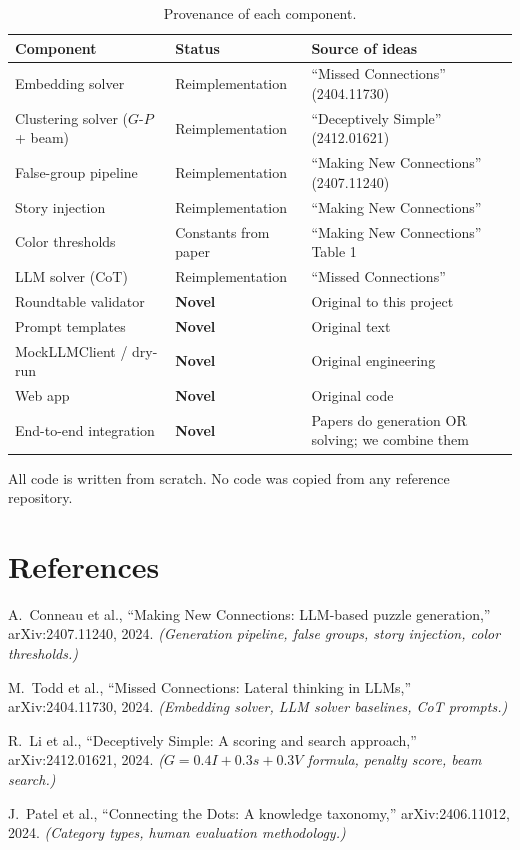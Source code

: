 \documentclass[11pt, letterpaper]{article}
\begin{document}
\begin{table}[H]
\centering
\small
\caption{Provenance of each component.}
\begin{tabular}{@{}lll@{}}
\toprule
Component & Status & Source of ideas \\
\midrule
Embedding solver & Reimplementation & ``Missed Connections'' (2404.11730) \\
Clustering solver ($G$-$P$ + beam) & Reimplementation & ``Deceptively Simple'' (2412.01621) \\
False-group pipeline & Reimplementation & ``Making New Connections'' (2407.11240) \\
Story injection & Reimplementation & ``Making New Connections'' \\
Color thresholds & Constants from paper & ``Making New Connections'' Table 1 \\
LLM solver (CoT) & Reimplementation & ``Missed Connections'' \\
\midrule
Roundtable validator & \textbf{Novel} & Original to this project \\
Prompt templates & \textbf{Novel} & Original text \\
MockLLMClient / dry-run & \textbf{Novel} & Original engineering \\
Web app & \textbf{Novel} & Original code \\
End-to-end integration & \textbf{Novel} & Papers do generation OR solving; we combine them \\
\bottomrule
\end{tabular}
\end{table}

All code is written from scratch. No code was copied from any reference repository.

\section{References}

\begin{enumerate}[nosep, label={[\arabic*]}]
    \item A.\ Conneau et al., ``Making New Connections: LLM-based puzzle generation,'' arXiv:2407.11240, 2024. \emph{(Generation pipeline, false groups, story injection, color thresholds.)}
    \item M.\ Todd et al., ``Missed Connections: Lateral thinking in LLMs,'' arXiv:2404.11730, 2024. \emph{(Embedding solver, LLM solver baselines, CoT prompts.)}
    \item R.\ Li et al., ``Deceptively Simple: A scoring and search approach,'' arXiv:2412.01621, 2024. \emph{($G = 0.4I + 0.3s + 0.3V$ formula, penalty score, beam search.)}
    \item J.\ Patel et al., ``Connecting the Dots: A knowledge taxonomy,'' arXiv:2406.11012, 2024. \emph{(Category types, human evaluation methodology.)}
\end{enumerate}
\end{document}
